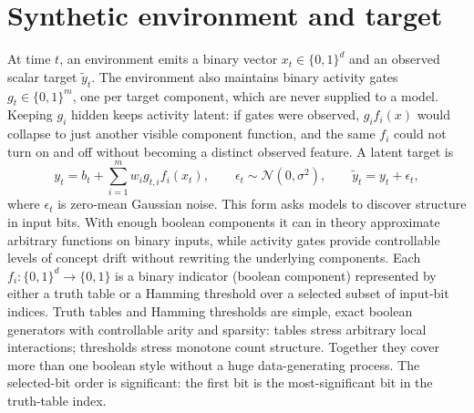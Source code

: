 \documentclass[11pt]{article}
\begin{document}
\section{Synthetic environment and target}
At time $t$, an environment emits a binary vector $x_t\in\{0,1\}^d$ and an
observed scalar target $\tilde y_t$.  The environment also maintains binary
activity gates $g_t\in\{0,1\}^m$, one per target component, which are never
supplied to a model.  Keeping $g_i$ hidden keeps activity latent: if gates were
observed, $g_i f_i(x)$ would collapse to just another visible component
function, and the same $f_i$ could not turn on and off without becoming a
distinct observed feature.  A latent target is
\[
y_t=b_t+\sum_{i=1}^{m}w_i g_{t,i}f_i(x_t),
\qquad
\epsilon_t\sim\mathcal N(0,\sigma^2),
\qquad
\tilde y_t=y_t+\epsilon_t,
\]
where $\epsilon_t$ is zero-mean Gaussian noise.  This form asks models to
discover structure in input bits.  With enough boolean components it can in
theory approximate arbitrary functions on binary inputs, while activity gates
provide controllable levels of concept drift without rewriting the underlying
components.  Each $f_i:\{0,1\}^d\to\{0,1\}$ is a binary indicator
(boolean component) represented by either a truth table or a Hamming threshold
over a selected subset of input-bit indices.  Truth tables and Hamming
thresholds are simple, exact boolean generators with controllable arity and
sparsity: tables stress arbitrary local interactions; thresholds stress
monotone count structure.  Together they cover more than one boolean style
without a huge data-generating process.  The selected-bit order is significant:
the first bit is the most-significant bit in the truth-table index.
\end{document}
